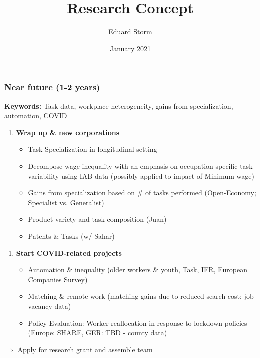 \documentclass[10pt]{beamer}
\title[Research]{Research Concept} %
\author{Eduard Storm} %
\institute[estorm@carleton.edu]
{
	
	
	\medskip 
	
	
	
	
}
\date{January 2021} %
\begin{document}
\begin{frame}
\titlepage %
\end{frame}


\begin{frame} 
	\frametitle{Near future (1-2 years)}

\textbf{Keywords:} Task data, workplace heterogeneity, gains from specialization, automation, COVID

\bigskip
	
\begin{enumerate}
	\item \textbf{Wrap up \& new corporations}
		\begin{itemize}
			\item Task Specialization in longitudinal setting
			\item Decompose wage inequality with an emphasis on occupation-specific task variability using IAB data (possibly applied to impact of Minimum wage)
			\item Gains from specialization based on \# of tasks performed (Open-Economy; Specialist vs. Generalist)
			\smallskip
			\item Product variety and task composition (Juan)
			\item Patents \& Tasks (w/ Sahar)
		\end{itemize}
\end{enumerate}	


\bigskip

\begin{enumerate}
	\item \textbf{Start COVID-related projects}
	\begin{itemize}
		\item Automation \& inequality (older workers \& youth, Task, IFR, European Companies Survey)
		\item Matching \& remote work (matching gains due to reduced search cost; job vacancy data)
		\item Policy Evaluation: Worker reallocation in response to lockdown policies (Europe: SHARE, GER: TBD - county data)
	\end{itemize}
\end{enumerate}
	
\bigskip

$\Longrightarrow$ Apply for research grant and assemble team	
	
\end{frame}
\end{document}

